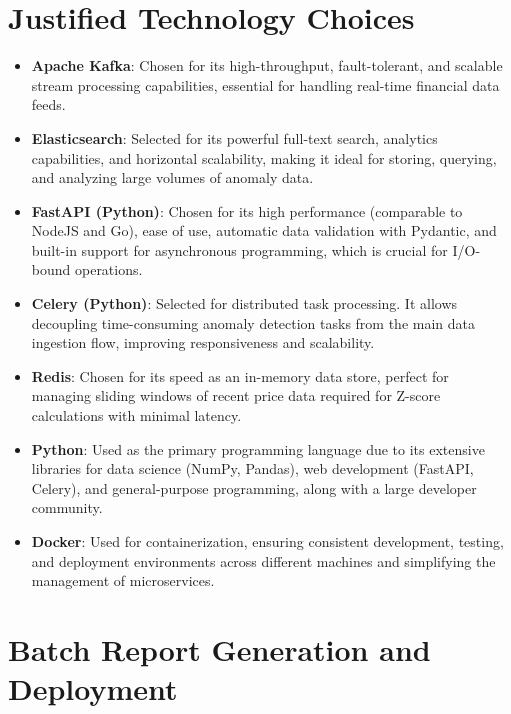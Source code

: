 \section{Justified Technology Choices}

\begin{itemize}
    \item \textbf{Apache Kafka}: Chosen for its high-throughput, fault-tolerant, and scalable stream processing capabilities, essential for handling real-time financial data feeds.
    
    \item \textbf{Elasticsearch}: Selected for its powerful full-text search, analytics capabilities, and horizontal scalability, making it ideal for storing, querying, and analyzing large volumes of anomaly data.
    
    \item \textbf{FastAPI (Python)}: Chosen for its high performance (comparable to NodeJS and Go), ease of use, automatic data validation with Pydantic, and built-in support for asynchronous programming, which is crucial for I/O-bound operations.
    
    \item \textbf{Celery (Python)}: Selected for distributed task processing. It allows decoupling time-consuming anomaly detection tasks from the main data ingestion flow, improving responsiveness and scalability.
    
    \item \textbf{Redis}: Chosen for its speed as an in-memory data store, perfect for managing sliding windows of recent price data required for Z-score calculations with minimal latency.
    
    \item \textbf{Python}: Used as the primary programming language due to its extensive libraries for data science (NumPy, Pandas), web development (FastAPI, Celery), and general-purpose programming, along with a large developer community.
    
    \item \textbf{Docker}: Used for containerization, ensuring consistent development, testing, and deployment environments across different machines and simplifying the management of microservices.
\end{itemize}

\section{Batch Report Generation and Deployment}








